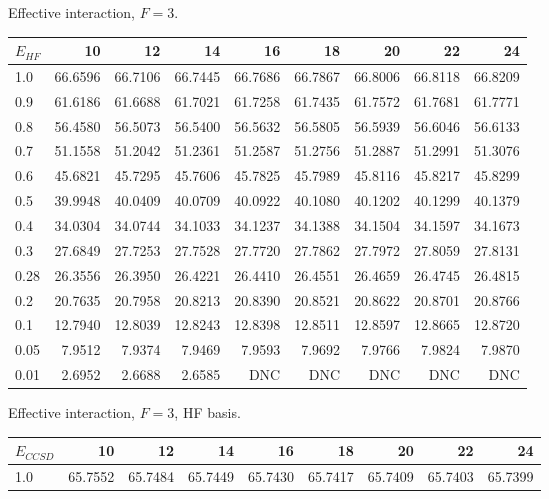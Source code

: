 \begin{landscape}
\begin{table}
\begin{center}
Effective interaction, $F=3$.\\
\begin{tabular}{l|rrrrrrrr}
\hline 
$E_{HF}$ & 10 & 12 & 14 & 16 & 18 & 20 & 22 & 24 \\
\hline \hline
1.0 & 66.6596 & 66.7106 & 66.7445 & 66.7686 & 66.7867 & 66.8006  & 66.8118 & 66.8209 \\ 
0.9 & 61.6186 & 61.6688 & 61.7021 & 61.7258 & 61.7435 & 61.7572  & 61.7681 & 61.7771 \\ 
0.8 & 56.4580 & 56.5073 & 56.5400 & 56.5632 & 56.5805 & 56.5939  & 56.6046 & 56.6133 \\ 
0.7 & 51.1558 & 51.2042 & 51.2361 & 51.2587 & 51.2756 & 51.2887  & 51.2991 & 51.3076 \\ 
0.6 & 45.6821 & 45.7295 & 45.7606 & 45.7825 & 45.7989 & 45.8116  & 45.8217 & 45.8299 \\ 
0.5 & 39.9948 & 40.0409 & 40.0709 & 40.0922 & 40.1080 & 40.1202  & 40.1299 & 40.1379 \\ 
0.4 & 34.0304 & 34.0744 & 34.1033 & 34.1237 & 34.1388 & 34.1504  & 34.1597 & 34.1673 \\ 
0.3 & 27.6849 & 27.7253 & 27.7528 & 27.7720 & 27.7862 & 27.7972  & 27.8059 & 27.8131 \\ 
0.28 &26.3556 & 26.3950 & 26.4221 & 26.4410 & 26.4551 & 26.4659  & 26.4745 & 26.4815 \\ 
0.2 & 20.7635 & 20.7958 & 20.8213 & 20.8390 & 20.8521 & 20.8622  & 20.8701 & 20.8766 \\ 
0.1 & 12.7940 & 12.8039 & 12.8243 & 12.8398 & 12.8511 & 12.8597  & 12.8665 & 12.8720 \\ 
0.05 & 7.9512 &  7.9374 &  7.9469 &  7.9593 & 7.9692  &  7.9766  &  7.9824 &  7.9870 \\ 
0.01 & 2.6952 &  2.6688 &  2.6585 &  DNC    &    DNC  &     DNC  &     DNC &     DNC \\ 
\hline \hline
\end{tabular}
\end{center}
\begin{center}
Effective interaction, $F=3$, HF basis.\\
\begin{tabular}{l|rrrrrrrr}
\hline 
$E_{CCSD}$ & 10 & 12 & 14 & 16 & 18 & 20 & 22 & 24 \\
\hline \hline
1.0 &  65.7552 & 65.7484 & 65.7449 & 65.7430 & 65.7417 & 65.7409 & 65.7403 & 65.7399 \\ 

\end{tabular}
\end{center}
\end{table}
\end{landscape}
